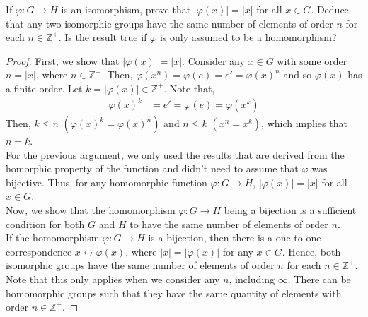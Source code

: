 \documentclass[12pt]{article}
\newcommand{\Z}{\mathbb{Z}}
\newenvironment{problem}[2][Problem]{\begin{trivlist} \item[\hskip \labelsep {\bfseries #1}\hskip \labelsep {\bfseries #2.}]}{\end{trivlist}}
\begin{document}
\begin{problem}{2}
  If $\varphi: G\to H$ is an isomorphism, prove that $|\varphi(x)| = |x|$ for all $x\in G$. Deduce that any two isomorphic groups have the same number of elements of order $n$ for each $n\in \Z^{+}$. Is the result true if $\varphi$ is only assumed to be a homomorphism?
\begin{proof}
  First, we show that $|\varphi(x)|=|x|$. Consider any $x\in G$ with some order $n=|x|$, where $n\in \Z^{+}$. Then, $\varphi(x^{n}) = \varphi(e) = e' = \varphi(x)^{n}$ and so $\varphi(x)$ has a finite order. Let $k=|\varphi(x)|\in \Z^{+}$. Note that, 
\begin{align*}
  \varphi(x)^{k} &= e' = \varphi(e) = \varphi(x^{k})
\end{align*}
Then, $k\leq n$ $(\varphi(x)^{k} = \varphi(x)^{n})$ and $n\leq k$ $(x^{n} = x^{k})$, which implies that $n=k$.\\
For the previous argument, we only used the results that are derived from the homorphic property of the function and didn't need to assume that $\varphi$ was bijective. Thus, for any homomorphic function $\varphi: G\to H$, $|\varphi(x)|=|x|$ for all $x\in G$.\\

Now, we show that the homomorphism $\varphi:G\to H$ being a bijection is a sufficient condition for both $G$ and $H$ to have the same number of elements of order $n$.\\
If the homomorphism $\varphi:G\to H$ is a bijection, then there is a one-to-one correspondence $x\leftrightarrow \varphi(x)$, where $|x|=|\varphi(x)|$ for any $x\in G$. Hence, both isomorphic groups have the same number of elements of order $n$ for each $n\in \Z^{+}$. \\

Note that this only applies when we consider any $n$, including $\infty$. There can be homomorphic groups such that they have the same quantity of elements with order $n\in \Z^{+}$.
\end{proof}
\end{problem}
\end{document}
